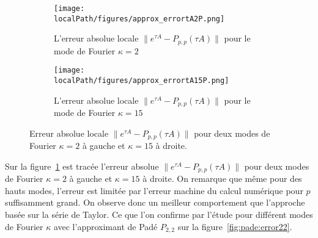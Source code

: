
\begin{figure}
  \begin{subfigure}{.5\textwidth}
    \centering
    \texttt{[image: \\localPath/figures/approx\_errortA2P.png]}
    \caption{L'erreur absolue locale $\|e^{\tau A}-P_{p,p}(\tau A)\|$ pour le mode de Fourier $\kappa=2$}
  \end{subfigure}
  \begin{subfigure}{.5\textwidth}
    \centering
    \texttt{[image: \\localPath/figures/approx\_errortA15P.png]}
    \caption{L'erreur absolue locale $\|e^{\tau A}-P_{p,p}(\tau A)\|$ pour le mode de Fourier $\kappa=15$}
  \end{subfigure}
  \caption{Erreur absolue locale $\|e^{\tau A}-P_{p,p}(\tau A)\|$ pour deux modes de Fourier $\kappa=2$ à gauche et $\kappa=15$ à droite.}
  \label{fig:pade:error}
\end{figure}

Sur la figure~\ref{fig:pade:error} est tracée l'erreur absolue $\|e^{\tau A}-P_{p,p}(\tau A)\|$ pour deux modes de Fourier $\kappa=2$ à gauche et $\kappa=15$ à droite. On remarque que même pour des hauts modes, l'erreur est limitée par l'erreur machine du calcul numérique pour $p$ suffisamment grand. On observe donc un meilleur comportement que l'approche basée sur la série de Taylor. Ce que l'on confirme par l'étude pour différent modes de Fourier $\kappa$ avec l'approximant de Padé $P_{2,2}$ sur la figure~\ref{fig:pade:error22}.

